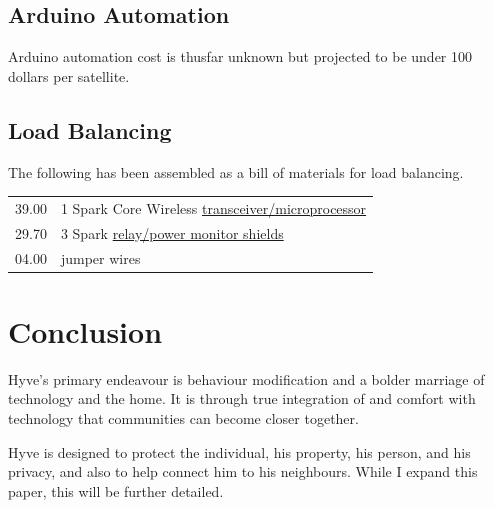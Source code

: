 	\subsection{Arduino Automation}
	
		Arduino automation cost is thusfar unknown but projected to be under 100 dollars per satellite.
	
	\subsection{Load Balancing}
	
		The following has been assembled as a bill of materials for load balancing. \\
		\begin{tabular}{r|l}
			39.00 &	1 Spark Core Wireless \href{https://www.spark.io}{transceiver/microprocessor} \\
			29.70 & 3  Spark \href{http://oshpark.com/shared_projects/E1XSjK44}{relay/power monitor shields} \\
			04.00 & jumper wires
		\end{tabular}
		
\section{Conclusion}

	Hyve's primary endeavour is behaviour modification and a bolder marriage of technology and the home.
	It is through true integration of and comfort with technology that communities can become closer together.
	
	Hyve is designed to protect the individual, his property, his person, and his privacy, and also to help connect him to his neighbours.
	While I expand this paper, this will be further detailed.

